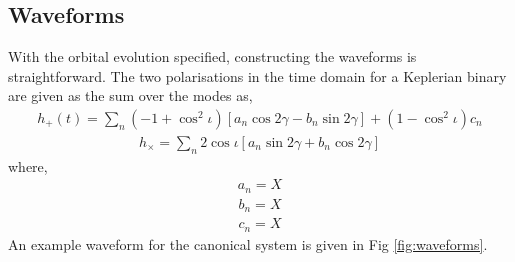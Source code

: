 \documentclass[a4paper,fleqn,usenatbib]{mnras}
\begin{document}
\subsection{Waveforms}


With the orbital evolution specified, constructing the waveforms is straightforward. The two polarisations in the time domain for a Keplerian binary are given as the sum over the modes as,
\begin{eqnarray}
h_{+} (t)= \sum_n (-1 + \cos^2 \iota) \left[a_n \cos 2 \gamma -b_n \sin2 \gamma\right] + (1-\cos^2 \iota) c_n
\end{eqnarray}
\begin{eqnarray}
h_{\times} = \sum_n 2 \cos \iota \left[ a_n \sin 2 \gamma + b_n \cos 2 \gamma\right]
\end{eqnarray}
where,
\begin{eqnarray}
a_n = X
\end{eqnarray}
\begin{eqnarray}
b_n = X
\end{eqnarray}
\begin{eqnarray}
c_n = X
\end{eqnarray}
An example waveform for the canonical system is given in Fig \ref{fig:waveforms}.
\end{document}
